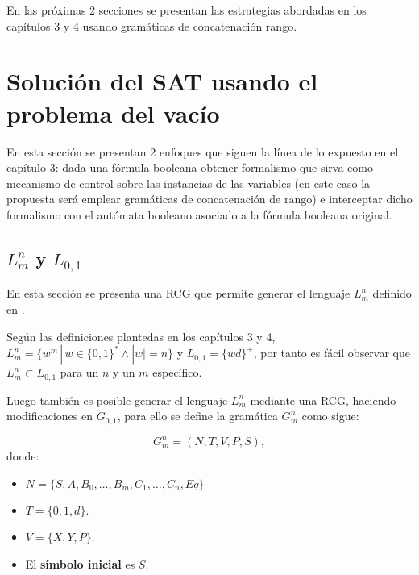 En las próximas 2 secciones se presentan las estrategias abordadas en los capítulos 3 y 4 usando gramáticas de concatenación
rango.

\section{Solución del SAT usando el problema del vacío}

En esta sección se presentan 2 enfoques que siguen la línea de lo expuesto en el capítulo 3: dada una fórmula booleana
obtener formalismo que sirva como mecanismo de control sobre las instancias de las variables (en este caso la propuesta será emplear gramáticas
de concatenación de rango) e interceptar dicho formalismo con el autómata booleano asociado a la fórmula booleana
original.

\subsection{$L^n_m$ y $L_{0,1}$}

En esta sección se presenta una RCG que permite generar el lenguaje $L^n_m$ definido en \cite{aSMSAT}.

Según las definiciones plantedas en los capítulos 3 y 4, $L^n_m=\{w^m\,|\,w\in\{0,1\}^* \wedge |w|=n\}$ y $L_{0,1}=\{wd\}^+$, por tanto
es fácil observar que $L^n_m \subset L_{0,1}$ para un $n$ y un $m$ específico.

Luego también es posible generar el lenguaje $L^n_m$ mediante una RCG, haciendo modificaciones en $G_{0,1}$, para ello
se define la gramática $G^n_m$ como sigue:

\[
    G^n_m = (N, T, V, P, S),
\]
donde:

\begin{itemize}
    \item $N=\{S,A,B_0,\ldots,B_m,C_1,\ldots,C_n,Eq\}$
    \item $T=\{0,1,d\}$.
    \item $V=\{X,Y,P\}$.
    \item El \textbf{símbolo inicial} es $S$.
\end{itemize}


